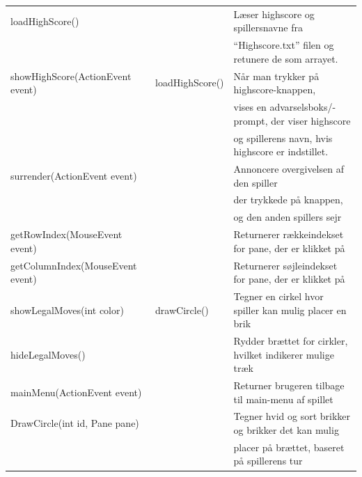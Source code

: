 \begin{table}[H]
\begin{tabular}{lll}
        loadHighScore()                      &                 & Læser highscore og spillersnavne fra                      \\
                                             &                 & ``Highscore.txt'' filen og retunere de som arrayet.       \\
        showHighScore(ActionEvent event)     & loadHighScore() & Når man trykker på highscore-knappen,                     \\
                                             &                 & vises en advarselsboks/-prompt, der viser highscore       \\
                                             &                 & og spillerens navn, hvis highscore er indstillet.         \\
        surrender(ActionEvent event)         &                 & Annoncere overgivelsen af den spiller                     \\
                                             &                 & der trykkede på knappen,                                  \\
                                             &                 & og den anden spillers sejr                                \\
        getRowIndex(MouseEvent event)        &                 & Returnerer rækkeindekset for pane, der er klikket på      \\
        getColumnIndex(MouseEvent event)     &                 & Returnerer søjleindekset for pane, der er klikket på      \\
        showLegalMoves(int color)            & drawCircle()    & Tegner en cirkel hvor spiller kan mulig placer en brik    \\
        hideLegalMoves()                     &                 & Rydder brættet for cirkler, hvilket indikerer mulige træk \\
        mainMenu(ActionEvent event)          &                 & Returner brugeren tilbage til main-menu af spillet        \\
        DrawCircle(int id, Pane pane)        &                 & Tegner hvid og sort brikker og brikker det kan mulig      \\
                                             &                 & placer på brættet, baseret på spillerens tur              \\
        \bottomrule
    \end{tabular}
\end{table}
